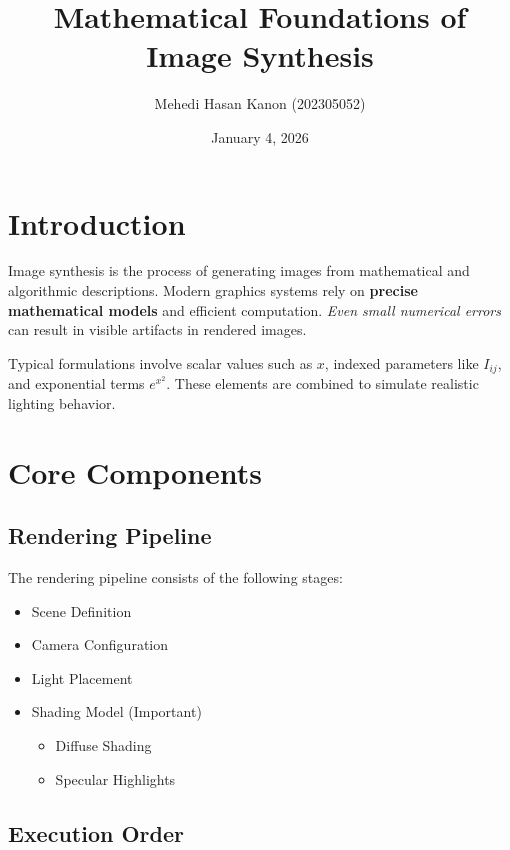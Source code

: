 \documentclass{article}
\begin{document}
\title{Mathematical Foundations of Image Synthesis}

\author{Mehedi Hasan Kanon (202305052)}

\date{January 4, 2026}

\maketitle

\section{Introduction}

Image synthesis is the process of generating images from mathematical and algorithmic descriptions. Modern graphics systems rely on \textbf{precise mathematical models} and efficient computation. \textit{Even small numerical errors} can result in visible artifacts in rendered images.

Typical formulations involve scalar values such as $x$, indexed parameters like $I_{ij}$, and exponential terms $e^{x^{2}}$. These elements are combined to simulate realistic lighting behavior.


\section{Core Components}

\subsection{Rendering Pipeline}

The rendering pipeline consists of the following stages:

\begin{itemize}
    \item Scene Definition
    \item Camera Configuration
    \item Light Placement
    \item Shading Model (Important)
    \begin{itemize}
        \item Diffuse Shading
        \item Specular Highlights
    \end{itemize}
\end{itemize}


\subsection{Execution Order}
\end{document}
